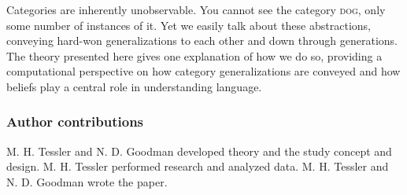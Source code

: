 \documentclass[12pt,letterpaper]{article}
\begin{document}
Categories are inherently unobservable. 
You cannot see the category \textsc{dog}, only some number of instances of it.
Yet we easily talk about these abstractions, conveying hard-won generalizations to each other and down through generations.
The theory presented here gives one explanation of how we do so, providing a computational perspective on how category generalizations are conveyed and how beliefs play a central role in understanding language.

















%

\subsubsection*{Author contributions}
M. H. Tessler and N. D. Goodman developed theory and the study concept and design.
M. H. Tessler performed research and analyzed data.
M. H. Tessler and N. D. Goodman wrote the paper.
\end{document}
